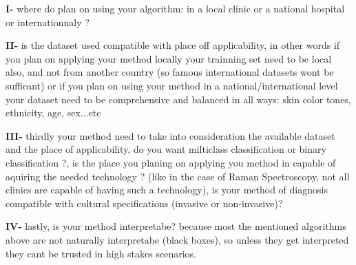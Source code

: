     \textbf{I-} where do plan on using your algorithm: in a local clinic or a national hospital or internationnaly ?
    
    \textbf{II-} is the dataset used compatible with place off applicability, in other words if you plan on applying your method locally your trainning set need to be local also, and not from another country (so famous international datasets wont be sufficant) or if you plan on using your method in a national/international level your dataset need to be comprehensive and balanced in all ways: skin color tones, ethnicity, age, sex...etc 
    
    \textbf{III-} thirdly your method need to take into consideration the available dataset and the place of applicability, do you want milticlass classification or binary classification ?, is the place you planing on applying you method in capable of aquiring the needed technology ? (like in the case of Raman Spectroscopy, not all clinics are capable of having such a technology), is your method of diagnosis compatible with cultural specifications (invasive or non-invasive)? 

    \textbf{IV-} lastly, is your method interpretabe? because most the mentioned algorithms above are not naturally interpretabe (black boxes), so unless they get interpreted they cant be trusted in high stakes scenarios.


